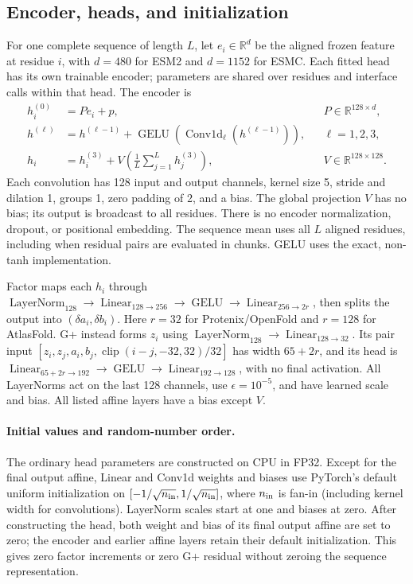 \subsection{Encoder, heads, and initialization}
\label{app:adapter_definition}
For one complete sequence of length $L$, let $e_i\in\mathbb R^d$ be the
aligned frozen feature at residue $i$, with $d=480$ for ESM2 and $d=1152$
for ESMC. Each fitted head has its own trainable encoder; parameters are
shared over residues and interface calls within that head. The encoder is
\begin{align}
 h_i^{(0)}&=P e_i+p, &&P\in\mathbb R^{128\times d},\\
 h^{(\ell)}&=h^{(\ell-1)}+
   \operatorname{GELU}\!\left(\operatorname{Conv1d}_{\ell}
   (h^{(\ell-1)})\right), &&\ell=1,2,3,\\
 h_i&=h_i^{(3)}+V\left(\frac{1}{L}\sum_{j=1}^{L}h_j^{(3)}\right),
 &&V\in\mathbb R^{128\times128}.
\end{align}
Each convolution has 128 input and output channels, kernel size 5, stride
and dilation 1, groups 1, zero padding of 2, and a bias. The global projection
$V$ has no bias; its output is broadcast to all residues. There is no
encoder normalization, dropout, or positional embedding. The sequence mean
uses all $L$ aligned residues, including when residual pairs are evaluated
in chunks. GELU uses the exact, non-tanh implementation.

Factor maps each $h_i$ through
$\operatorname{LayerNorm}_{128}\to\operatorname{Linear}_{128\to256}
\to\operatorname{GELU}\to\operatorname{Linear}_{256\to2r}$,
then splits the output into $(\delta a_i,\delta b_i)$.
Here $r=32$ for Protenix/OpenFold and $r=128$ for AtlasFold.
G+ instead forms $z_i$ using
$\operatorname{LayerNorm}_{128}\to\operatorname{Linear}_{128\to32}$.
Its pair input $[z_i,z_j,a_i,b_j,\operatorname{clip}(i-j,-32,32)/32]$
has width $65+2r$, and its head is
$\operatorname{Linear}_{65+2r\to192}\to\operatorname{GELU}
\to\operatorname{Linear}_{192\to128}$, with no final activation.
All LayerNorms act on the last 128 channels, use $\epsilon=10^{-5}$,
and have learned scale and bias. All listed affine layers have a bias
except $V$.

\paragraph{Initial values and random-number order.}
The ordinary head parameters are constructed on CPU in FP32. Except for
the final output affine, Linear and Conv1d weights and biases use PyTorch's
default uniform initialization on $[-1/\sqrt{n_{\rm in}},1/\sqrt{n_{\rm in}}]$,
where $n_{\rm in}$ is fan-in (including kernel width for convolutions).
LayerNorm scales start at one and biases at zero. After constructing the
head, both weight and bias of its final output affine are set to zero;
the encoder and earlier affine layers retain their default initialization.
This gives zero factor increments or zero G+ residual without zeroing
the sequence representation.

